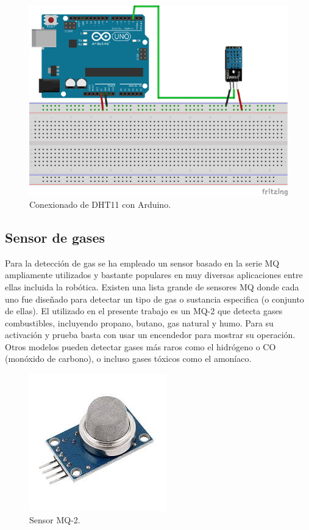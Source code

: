 \begin{figure}[H]
  \begin{center}
    \includegraphics[scale=0.6]{imagenes/dth11_conexionado.jpg}
  \end{center}
  \caption{Conexionado de DHT11 con Arduino.}
  \label{figura:sensor_dth11_bits}
\end{figure}

\subsection{Sensor de gases}


Para la detección de gas se ha empleado un sensor basado en la serie MQ ampliamente utilizados y bastante populares en muy diversas aplicaciones entre ellas incluida la robótica.
Existen una lista grande de sensores MQ donde cada uno fue diseñado para detectar un tipo de gas o sustancia especifica (o conjunto de ellas). El utilizado en el presente trabajo 
es un MQ-2 que detecta gases combustibles, incluyendo propano, butano, gas natural y humo. Para su activación y prueba basta con usar un encendedor para mostrar su operación. 
Otros modelos pueden detectar gases más raros como el hidrógeno o CO (monóxido de carbono), o incluso gases tóxicos como el amoníaco.\\

\begin{figure}[H]
  \begin{center}
    \includegraphics[scale=0.6]{imagenes/mq2_sensor.jpeg}
  \end{center}
  \caption{Sensor MQ-2.}
  \label{figura:sensor_mq_2}
\end{figure}

